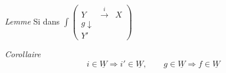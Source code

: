 \documentclass[11pt,a4paper]{article}
\begin{document}
\emph{Lemme} Si dans $\int \left(\begin{smallmatrix} Y & \xrightarrow{i} & X \\ {\scriptstyle g}\downarrow & & \\ Y' & & \end{smallmatrix}\right)$ \ill{}

\emph{Corollaire}
\[
  i \in \underline{W} \Longrightarrow i' \in \underline{W}, \qquad
  g \in \underline{W} \Longrightarrow f \in \underline{W}
\]
\end{document}
